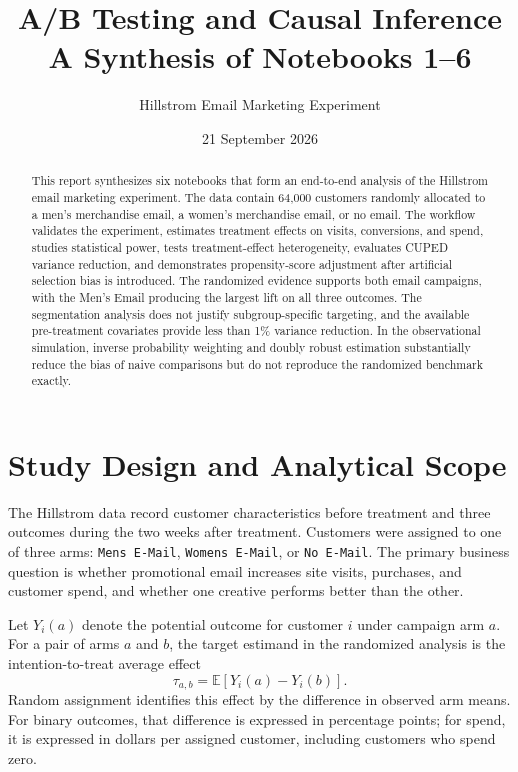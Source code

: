 \documentclass[11pt]{article}
\title{\textbf{A/B Testing and Causal Inference}\\
\large A Synthesis of Notebooks 1--6}
\author{Hillstrom Email Marketing Experiment}
\date{21 September 2026}
\begin{document}
\maketitle

\begin{abstract}
This report synthesizes six notebooks that form an end-to-end analysis of the Hillstrom email marketing experiment. The data contain 64,000 customers randomly allocated to a men's merchandise email, a women's merchandise email, or no email. The workflow validates the experiment, estimates treatment effects on visits, conversions, and spend, studies statistical power, tests treatment-effect heterogeneity, evaluates CUPED variance reduction, and demonstrates propensity-score adjustment after artificial selection bias is introduced. The randomized evidence supports both email campaigns, with the Men's Email producing the largest lift on all three outcomes. The segmentation analysis does not justify subgroup-specific targeting, and the available pre-treatment covariates provide less than 1\% variance reduction. In the observational simulation, inverse probability weighting and doubly robust estimation substantially reduce the bias of naive comparisons but do not reproduce the randomized benchmark exactly.
\end{abstract}

\begingroup
\small
\setlength{\parskip}{0pt}
\tableofcontents
\endgroup
\newpage

\section{Study Design and Analytical Scope}

The Hillstrom data record customer characteristics before treatment and three outcomes during the two weeks after treatment. Customers were assigned to one of three arms: \texttt{Mens E-Mail}, \texttt{Womens E-Mail}, or \texttt{No E-Mail}. The primary business question is whether promotional email increases site visits, purchases, and customer spend, and whether one creative performs better than the other.

Let $Y_i(a)$ denote the potential outcome for customer $i$ under campaign arm $a$. For a pair of arms $a$ and $b$, the target estimand in the randomized analysis is the intention-to-treat average effect
\begin{equation}
    \tau_{a,b}=\mathbb{E}\!\left[Y_i(a)-Y_i(b)\right].
\end{equation}
Random assignment identifies this effect by the difference in observed arm means. For binary outcomes, that difference is expressed in percentage points; for spend, it is expressed in dollars per assigned customer, including customers who spend zero.
\end{document}
